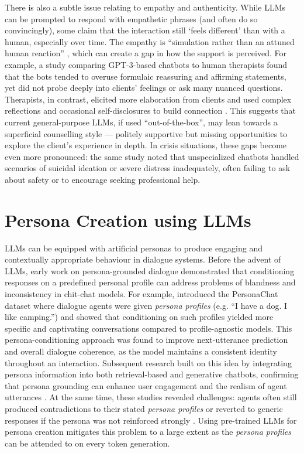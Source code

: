 There is also a subtle issue relating to empathy and authenticity. While LLMs can be prompted to respond with empathetic phrases (and often do so convincingly), some claim that the interaction still `feels different' than with a human, especially over time. The empathy is ``simulation rather than an attuned human reaction'' \cite{SEITZ2024100067}, which can create a gap in how the support is perceived. For example, a study comparing GPT-3-based chatbots to human therapists found that the bots tended to overuse formulaic reassuring and affirming statements, yet did not probe deeply into clients' feelings or ask many nuanced questions. Therapists, in contrast, elicited more elaboration from clients and used complex reflections and occasional self-disclosures to build connection \cite{Scholich2025}. This suggests that current general-purpose LLMs, if used ``out-of-the-box'', may lean towards a superficial counselling style --- politely supportive but missing opportunities to explore the client's experience in depth. In crisis situations, these gaps become even more pronounced: the same study noted that unspecialized chatbots handled scenarios of suicidal ideation or severe distress inadequately, often failing to ask about safety or to encourage seeking professional help.


\section{Persona Creation using LLMs} 
LLMs can be equipped with artificial personas to produce engaging and contextually appropriate behaviour in dialogue systems. Before the advent of LLMs, early work on persona-grounded dialogue demonstrated that conditioning responses on a predefined personal profile can address problems of blandness and inconsistency in chit-chat models. For example, \cite{zhang-etal-2018-personalizing} introduced the PersonaChat dataset where dialogue agents were given \emph{persona profiles} (e.g. ``I have a dog. I like camping.'') and showed that conditioning on such profiles yielded more specific and captivating conversations compared to profile-agnostic models. This persona-conditioning approach was found to improve next-utterance prediction and overall dialogue coherence, as the model maintains a consistent identity throughout an interaction. Subsequent research built on this idea by integrating persona information into both retrieval-based and generative chatbots, confirming that persona grounding can enhance user engagement and the realism of agent utterances \cite{roller-etal-2021-recipes, li-etal-2016-persona}. At the same time, these studies revealed challenges: agents often still produced contradictions to their stated \emph{persona profiles} or reverted to generic responses if the persona was not reinforced strongly \cite{kim-etal-2020-will, song-etal-2020-profile}. Using pre-trained LLMs for persona creation mitigates this problem to a large extent as the \emph{persona profiles} can be attended to on every token generation.

